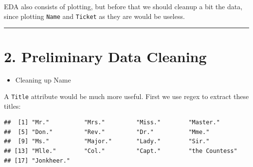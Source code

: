 \documentclass[]{article}
\newenvironment{Shaded}{\begin{snugshade}}{\end{snugshade}}
\newcommand{\KeywordTok}[1]{\textcolor[rgb]{0.13,0.29,0.53}{\textbf{#1}}}
\newcommand{\DataTypeTok}[1]{\textcolor[rgb]{0.13,0.29,0.53}{#1}}
\newcommand{\DecValTok}[1]{\textcolor[rgb]{0.00,0.00,0.81}{#1}}
\newcommand{\CharTok}[1]{\textcolor[rgb]{0.31,0.60,0.02}{#1}}
\newcommand{\StringTok}[1]{\textcolor[rgb]{0.31,0.60,0.02}{#1}}
\newcommand{\CommentTok}[1]{\textcolor[rgb]{0.56,0.35,0.01}{\textit{#1}}}
\newcommand{\ControlFlowTok}[1]{\textcolor[rgb]{0.13,0.29,0.53}{\textbf{#1}}}
\newcommand{\OperatorTok}[1]{\textcolor[rgb]{0.81,0.36,0.00}{\textbf{#1}}}
\newcommand{\NormalTok}[1]{#1}
\providecommand{\tightlist}{%
  \setlength{\itemsep}{0pt}\setlength{\parskip}{0pt}}
\begin{document}
EDA also consists of plotting, but before that we should cleanup a bit
the data, since plotting \texttt{Name} and \texttt{Ticket} as they are
would be useless.

\begin{center}\rule{0.5\linewidth}{\linethickness}\end{center}

\section{2. Preliminary Data Cleaning}\label{preliminary-data-cleaning}

\begin{itemize}
\tightlist
\item
  Cleaning up Name
\end{itemize}

A \texttt{Title} attribute would be much more useful. First we use regex
to extract these titles:

\begin{Shaded}
\end{Shaded}

\begin{verbatim}
##  [1] "Mr."          "Mrs."         "Miss."        "Master."     
##  [5] "Don."         "Rev."         "Dr."          "Mme."        
##  [9] "Ms."          "Major."       "Lady."        "Sir."        
## [13] "Mlle."        "Col."         "Capt."        "the Countess"
## [17] "Jonkheer."
\end{verbatim}
\end{document}
